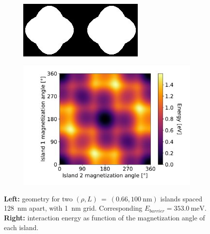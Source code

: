 \documentclass[11pt,a4paper,english]{article}
\begin{document}
\begin{figure}
    \centering
    \begin{subfigure}[c]{4cm} %
         \centering
         \includegraphics[width=\textwidth]{Figures/two_islands/Geometry/geom_r0.66_s100_d128_a0,0_cell1nm.png}
     \end{subfigure}
    \begin{subfigure}[c]{0.7\columnwidth}
         \centering
         \includegraphics[width=\textwidth]{Figures/two_islands/EnergyLandscape/Int_a0Pi,0Pi_d128_r0.66,0.66_cell1nm.pdf}
     \end{subfigure}
    \caption{\textbf{Left:} geometry for two $(\rho, L)~=~(0.66, \SI{100}{\nano\metre})$ islands spaced \SI{128}{\nano\metre} apart, with \SI{1}{\nano\metre} grid. Corresponding $E_{barrier}=\SI{353.0}{\milli\electronvolt}$. \textbf{Right:} interaction energy as function of the magnetization angle of each island.}
    \label{fig:two-islands_interaction_(0.66,100)_a0,0}
\end{figure}
\end{document}
